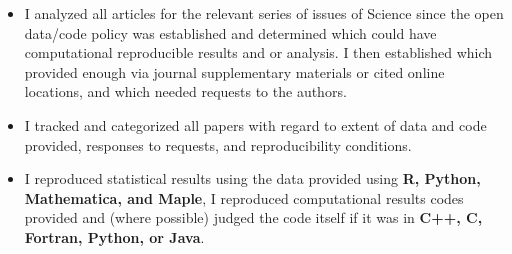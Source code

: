 \documentclass[]{seiler-resume}
\begin{document}
\begin{entrylist}
{\begin{itemize}[noitemsep, leftmargin=0.15in, parsep=0pt, partopsep=0pt]
	\item I analyzed all articles for the relevant series of issues of Science since the open data/code policy was established and determined which could have computational reproducible results and or analysis. I then established which provided enough via journal supplementary materials or cited online locations, and which needed requests to  the authors.
	\item I tracked and categorized all papers with regard to extent of data and code provided, responses to requests, and reproducibility conditions.
	\item  I reproduced statistical results using the data provided using {\bf R, Python, Mathematica, and Maple}, I reproduced computational results codes provided and (where possible) judged the code itself if it was in {\bf C++, C, Fortran, Python, or Java}.
\end{itemize}}
%
\end{entrylist}
\end{document}
